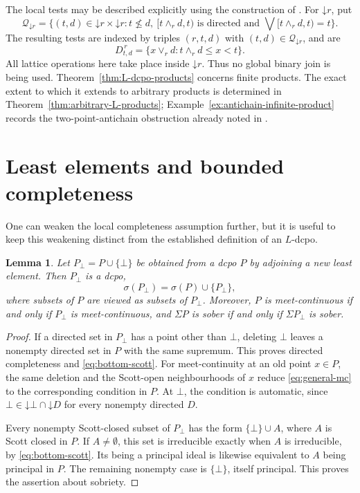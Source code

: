 \documentclass[10pt,a4paper]{amsart}
\newtheorem{lemma}[theorem]{Lemma}
\numberwithin{equation}{section}
\newcommand{\down}[1]{\mathord{\downarrow}#1}
\newcommand{\Sc}{\sigma}
\newcommand{\Sig}{\Sigma}
\newcommand{\mc}{\wedge}
\newcommand{\jc}{\vee}
\begin{document}
The local tests may be described explicitly using the construction of \cite[Proposition~3.3]{XuJi}. For $\down r$, put
\[
 \mathcal Q_{\down r}=\{(t,d)\in \down r\times \down r : t\nleq d,\ [t\mc_r d,t)
     \text{ is directed and }\bigvee[t\mc_r d,t)=t\}.
\]
The resulting tests are indexed by triples $(r,t,d)$ with $(t,d)\in\mathcal Q_{\down r}$, and are
\[
 D^{\,r}_{t,d}=\{x\jc_r d:t\mc_r d\le x<t\}.
\]
All lattice operations here take place inside $\down r$. Thus no global binary join is being used. Theorem~\ref{thm:L-dcpo-products} concerns finite products. The exact extent to which it extends to arbitrary products is determined in Theorem~\ref{thm:arbitrary-L-products}; Example~\ref{ex:antichain-infinite-product} records the two-point-antichain obstruction already noted in \cite[Section~5]{XuJi}.

\section{Least elements and bounded completeness}\label{sec:bottom}
One can weaken the local completeness assumption further, but it is useful to keep this weakening distinct from the established definition of an $L$-dcpo.

\begin{lemma}\label{lem:adjoin-bottom}
Let $P_\bot=P\cup\{\bot\}$ be obtained from a dcpo $P$ by adjoining a new least element. Then $P_\bot$ is a dcpo,
\begin{equation}\label{eq:bottom-scott}
 \Sc(P_\bot)=\Sc(P)\cup\{P_\bot\},
\end{equation}
where subsets of $P$ are viewed as subsets of $P_\bot$. Moreover, $P$ is meet-continuous if and only if $P_\bot$ is meet-continuous, and $\Sig P$ is sober if and only if $\Sig P_\bot$ is sober.
\end{lemma}
\begin{proof}
If a directed set in $P_\bot$ has a point other than $\bot$, deleting $\bot$ leaves a nonempty directed set in $P$ with the same supremum. This proves directed completeness and \eqref{eq:bottom-scott}. For meet-continuity at an old point $x\in P$, the same deletion and the Scott-open neighbourhoods of $x$ reduce \eqref{eq:general-mc} to the corresponding condition in $P$. At $\bot$, the condition is automatic, since $\bot\in\down\bot\cap\down D$ for every nonempty directed $D$.

Every nonempty Scott-closed subset of $P_\bot$ has the form $\{\bot\}\cup A$, where $A$ is Scott closed in $P$. If $A\ne\emptyset$, this set is irreducible exactly when $A$ is irreducible, by \eqref{eq:bottom-scott}. Its being a principal ideal is likewise equivalent to $A$ being principal in $P$. The remaining nonempty case is $\{\bot\}$, itself principal. This proves the assertion about sobriety.
\end{proof}
\end{document}
